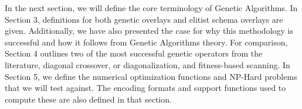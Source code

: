In the next section, we will define the core terminology of Genetic Algorithms. In Section 3, definitions for both genetic overlays and elitist schema overlays are given. Additionally, we have also presented the case for why this methodology is successful and how it follows from Genetic Algorithms theory. For comparison, Section 4 outlines two of the most successful genetic operators from the literature, diagonal crossover, or diagonalization, and fitness-based scanning. In Section 5, we define the numerical optimization functions and NP-Hard problems that we will test against. The encoding formats and support functions used to compute these are also defined in that section.